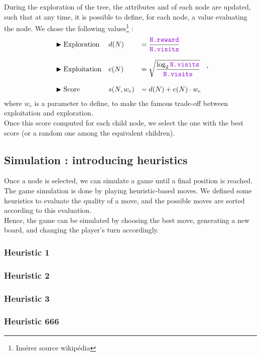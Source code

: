 \documentclass[11pt,a4paper]{article}
\begin{document}
During the exploration of the tree, the attributes  and  of each node are updated, such that at any time, it is possible to define, for each node, a value evaluating the node. We chose the following values\footnote{Insérer source wikipédia} :
$$
\begin{array}{lll}
    \blacktriangleright \text{Exploration} &d(N) &= \dfrac{\code{N.reward}}{\code{N.visits}} \\ \strut \\
    \blacktriangleright \text{Exploitation} &e(N) &= \sqrt{\dfrac{\log_2{\code{N.visits}}}{\code{N.visits}}} \\ \strut \\
    \blacktriangleright \text{Score} &s(N, w_e) &= d(N) + e(N)\cdot w_e \\
\end{array} \; ,
$$
where $w_e$ is a parameter to define, to make the famous trade-off between exploitation and exploration. \\

Once this score computed for each child node, we select the one with the best score (or a random one among the equivalent children).
\subsection{Simulation : introducing heuristics}
Once a node is selected, we can simulate a game until a final position is reached. The game simulation is done by playing heuristic-based moves. We defined some heuristics to evaluate the quality of a move, and the possible moves are sorted according to this evaluation. \\

Hence, the game can be simulated by choosing the best move, generating a new board, and changing the player's turn accordingly.

\subsubsection{Heuristic 1}
\subsubsection{Heuristic 2}
\subsubsection{Heuristic 3}
\subsubsection{Heuristic 666}
\end{document}
